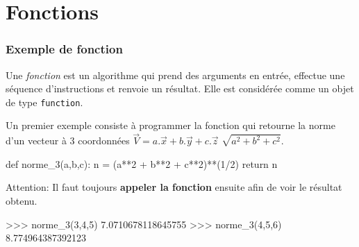 

\section{Fonctions} 

\begin{frame}[fragile]
\frametitle{Exemple de fonction}

Une \textit{fonction} est un algorithme qui prend des arguments en entrée, effectue une séquence d'instructions et renvoie un résultat. Elle est considérée comme un objet de type \verb?function?.

Un premier exemple consiste à programmer la fonction qui retourne la norme d'un vecteur à 3 coordonnées $\overrightarrow{V}=a.\overrightarrow{x}+b.\overrightarrow{y}+c.\overrightarrow{z}$ $\sqrt{a^2+b^2+c^2}$.

\begin{GrayBox}[0.85\textwidth]
\begin{verbatimtab}[3]
def norme_3(a,b,c):
	n = (a**2 + b**2 + c**2)**(1/2)
	return n
\end{verbatimtab}
\end{GrayBox}

Attention: Il faut toujours \textbf{appeler la fonction} ensuite afin de voir le résultat obtenu.

\begin{GrayBox}[0.85\textwidth]
\begin{verbatimtab}[3]
>>> norme_3(3,4,5)
7.0710678118645755
>>> norme_3(4,5,6)
8.774964387392123
\end{verbatimtab}
\end{GrayBox}

\end{frame}

